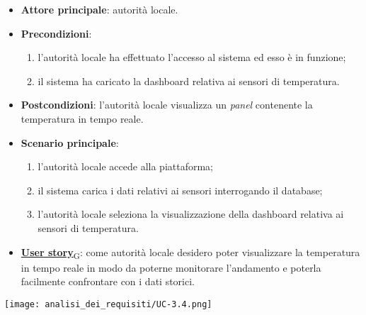 \begin{itemize}
	\item \textbf{Attore principale}: autorità locale.
	\item \textbf{Precondizioni}:
	      \begin{enumerate}
		      \item l'autorità locale ha effettuato l'accesso al sistema ed esso è in funzione;
		      \item il sistema ha caricato la dashboard relativa ai sensori di temperatura.
	      \end{enumerate}
	\item \textbf{Postcondizioni}: l'autorità locale visualizza un \textit{panel} contenente la temperatura in tempo reale.
	\item \textbf{Scenario principale}:
	      \begin{enumerate}
		      \item l'autorità locale accede alla piattaforma;
		      \item il sistema carica i dati relativi ai sensori interrogando il database;
		      \item l'autorità locale seleziona la visualizzazione della dashboard relativa ai sensori di temperatura.
	      \end{enumerate}
	\item \href{https://7last.github.io/docs/rtb/documentazione-interna/glossario\#user-story}{\textbf{User story}\textsubscript{G}}:
	      come autorità locale desidero poter visualizzare la temperatura in tempo reale in modo da poterne monitorare l'andamento
	      e poterla facilmente confrontare con i dati storici.
\end{itemize}
\begin{center}
	\texttt{[image: analisi\_dei\_requisiti/UC-3.4.png]}
\end{center}


